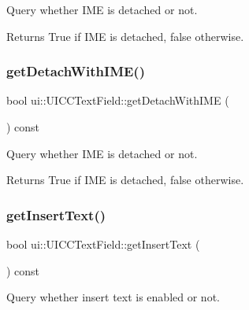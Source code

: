 Query whether I\+ME is detached or not. 

\begin{DoxyReturn}{Returns}
True if I\+ME is detached, false otherwise. 
\end{DoxyReturn}
\mbox{\label{classui_1_1UICCTextField_a834dc8e546abd0b02437018e97bbce71}} 
\subsubsection{\texorpdfstring{get\+Detach\+With\+I\+M\+E()}{getDetachWithIME()}\hspace{0.1cm}{\footnotesize\ttfamily [2/2]}}
{\footnotesize\ttfamily bool ui\+::\+U\+I\+C\+C\+Text\+Field\+::get\+Detach\+With\+I\+ME (\begin{DoxyParamCaption}{ }\end{DoxyParamCaption}) const}



Query whether I\+ME is detached or not. 

\begin{DoxyReturn}{Returns}
True if I\+ME is detached, false otherwise. 
\end{DoxyReturn}
\mbox{\label{classui_1_1UICCTextField_a789a293f8c433f6f434e57f8438193ab}} 
\subsubsection{\texorpdfstring{get\+Insert\+Text()}{getInsertText()}\hspace{0.1cm}{\footnotesize\ttfamily [1/2]}}
{\footnotesize\ttfamily bool ui\+::\+U\+I\+C\+C\+Text\+Field\+::get\+Insert\+Text (\begin{DoxyParamCaption}{ }\end{DoxyParamCaption}) const}



Query whether insert text is enabled or not. 

